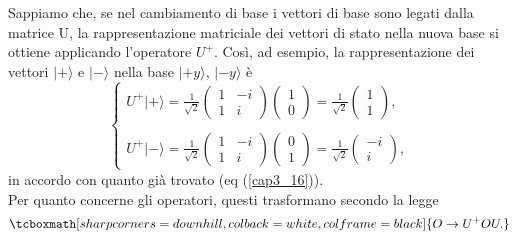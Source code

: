 \documentclass[a4paper,12pt,oneside]{book}
\begin{document}
Sappiamo che, se nel cambiamento di base i vettori di base sono legati dalla matrice U, la rappresentazione matriciale dei vettori di stato nella nuova base si ottiene applicando l'operatore $U^+$. Così, ad esempio, la rappresentazione dei vettori $| + \rangle $ e $| - \rangle $ nella base  $| +y \rangle $, $| -y \rangle $ è
	\begin{equation}
		\begin{cases}
		\displaystyle{U^+| + \rangle =\frac{1}{\sqrt{2}}
		\begin{pmatrix}
		1 & -i\\
		1 & i
		\end{pmatrix}
		\begin{pmatrix}
		1\\
		0
		\end{pmatrix}=
		\frac{1}{\sqrt{2}}
		\begin{pmatrix}
		1\\
		1
		\end{pmatrix} ,}\\
		\\
		\displaystyle{U^+| - \rangle =\frac{1}{\sqrt{2}}
		\begin{pmatrix}
		1 & -i\\
		1 & i
		\end{pmatrix}
		\begin{pmatrix}
		0\\
		1
		\end{pmatrix}=
		\frac{1}{\sqrt{2}}
		\begin{pmatrix}
		-i\\
		i
		\end{pmatrix} ,}
		\end{cases}
	\end{equation}
in accordo con quanto già trovato (eq (\ref{cap3_16})).\\

Per quanto concerne gli operatori, questi trasformano secondo la legge
	\begin{equation}
		\tcboxmath[sharp corners=downhill, colback=white, colframe=black]{
			O \rightarrow U^+OU .
			}
	\end{equation}\\
	
\end{document}
